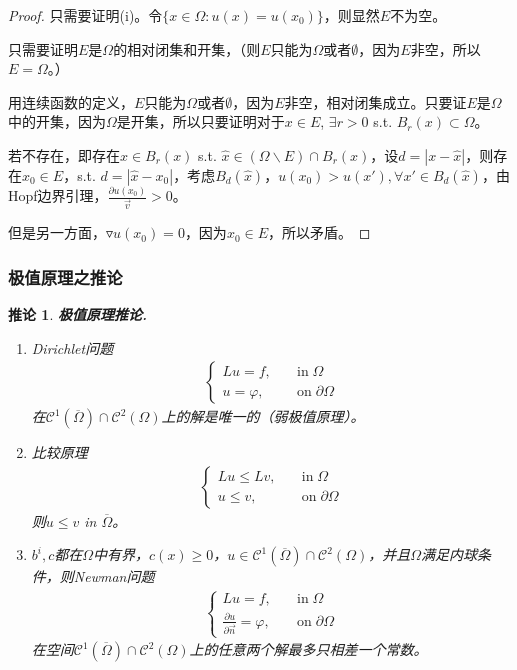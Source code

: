\documentclass[11pt, a4paper]{article}
\theoremstyle{theorem}
\newtheorem{cor}[thm]{推论}
\begin{document}
\begin{proof}
只需要证明(i)。令$\{x \in \Omega: u(x) = u(x_0)\}$，则显然$E$不为空。

只需要证明$E$是$\Omega$的相对闭集和开集，（则$E$只能为$\Omega$或者$\emptyset$，因为$E$非空，所以$E = \Omega$。）

用连续函数的定义，$E$只能为$\Omega$或者$\emptyset$，因为$E$非空，相对闭集成立。只要证$E$是$\Omega$中的开集，因为$\Omega$是开集，所以只要证明对于$x \in E$, $\exists r >0$ s.t. $B_r(x) \subset \Omega$。

若不存在，即存在$\hat{x} \in B_r(x)$ s.t. $\hat{x} \in (\Omega \backslash E) \cap B_r(x)$，设$d = |x - \hat{x}|$，则存在$x_0 \in E$，s.t. $d = |\hat{x} - x_0|$，考虑$B_d(\hat{x})$，$u(x_0) > u(x'), \forall x' \in B_d(\hat{x})$，由Hopf边界引理，$\frac{\partial u(x_0)}{\vec{v}} > 0$。

但是另一方面，$\triangledown u(x_0) = 0$，因为$x_0 \in E$，所以矛盾。
\end{proof}

\subsubsection{极值原理之推论}

\begin{cor} \textbf{极值原理推论.}
\begin{enumerate}
  \item Dirichlet问题
  \begin{align}
      \begin{cases}
        L u = f, \quad &\text{in} \; \Omega \\
        u = \varphi, \quad &\text{on} \; \partial \Omega
      \end{cases}
  \end{align}
  在$\mathcal{C}^1(\overline{\Omega}) \cap \mathcal{C}^2(\Omega)$上的解是唯一的（弱极值原理）。
  \item 比较原理
  \begin{align}
      \begin{cases}
        L u \leq L v, \quad &\text{in} \; \Omega \\
        u \leq v, \quad &\text{on} \; \partial \Omega
      \end{cases}
  \end{align}
  则$u \leq v$ in $\overline{\Omega}$。
  \item $b^i, c$都在$\Omega$中有界，$c(x) \geq 0$，$u \in \mathcal{C}^1(\overline{\Omega}) \cap \mathcal{C}^2(\Omega)$，并且$\Omega$满足内球条件，则Newman问题
    \begin{align}
      \begin{cases}
        L u = f, \quad &\text{in} \; \Omega \\
        \frac{\partial u}{\partial \vec{n}} = \varphi, \quad &\text{on} \; \partial \Omega
      \end{cases}
  \end{align}
  在空间$\mathcal{C}^1(\overline{\Omega}) \cap \mathcal{C}^2(\Omega)$上的任意两个解最多只相差一个常数。
\end{enumerate}
\end{cor}
\end{document}
